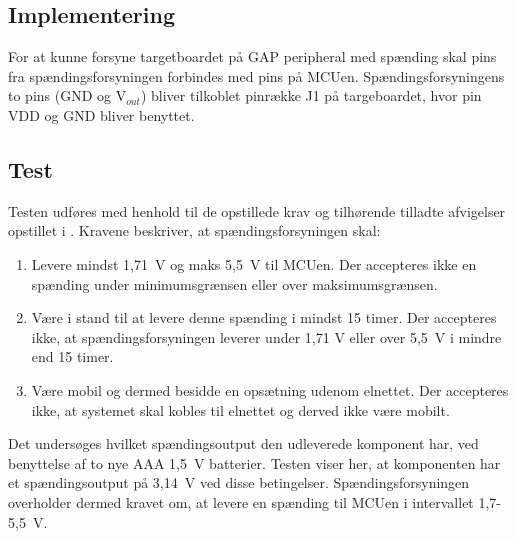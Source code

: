 \subsection{Implementering}
For at kunne forsyne targetboardet på GAP peripheral med spænding skal pins fra spændingsforsyningen forbindes med pins på MCUen. Spændingsforsyningens to pins (GND og V$_{out}$) bliver tilkoblet pinrække J1 på targeboardet, hvor pin VDD og GND bliver benyttet.

\subsection{Test} 
Testen udføres med henhold til de opstillede krav og tilhørende tilladte afvigelser opstillet i . Kravene beskriver, at spændingsforsyningen skal:
\begin{enumerate}
	\item Levere mindst 1,71~V og maks 5,5~V til MCUen. Der accepteres ikke en spænding under minimumsgrænsen eller over maksimumsgrænsen.
	\item Være i stand til at levere denne spænding i mindst 15 timer. Der accepteres ikke, at spændingsforsyningen leverer under 1,71 V eller over 5,5~V i mindre end 15 timer.
	\item Være mobil og dermed besidde en opsætning udenom elnettet. Der accepteres ikke, at systemet skal kobles til elnettet og derved ikke være mobilt.
\end{enumerate}

Det undersøges hvilket spændingsoutput den udleverede komponent har, ved benyttelse af to nye AAA 1,5~V batterier. Testen viser her, at komponenten har et spændingsoutput på 3,14~V ved disse betingelser.\newline
Spændingsforsyningen overholder dermed kravet om, at levere en spænding til MCUen i intervallet 1,7-5,5~V.




